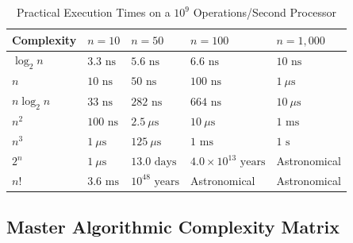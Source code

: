 \documentclass[10pt,a4paper]{article}
\theoremstyle{definition}
\begin{document}
\begin{table}[htbp]
\centering
\small
\caption{Practical Execution Times on a $10^9$ Operations/Second Processor}
\label{tab:times}
\vspace{2pt}
\begin{tabular}{@{}lllll@{}}
\toprule
\textbf{Complexity} & $n = 10$ & $n = 50$ & $n = 100$ & $n = 1,000$ \\
\midrule
$\log_2 n$ & $3.3 \text{ ns}$ & $5.6 \text{ ns}$ & $6.6 \text{ ns}$ & $10 \text{ ns}$ \\
$n$ & $10 \text{ ns}$ & $50 \text{ ns}$ & $100 \text{ ns}$ & $1 \ \mu\text{s}$ \\
$n \log_2 n$ & $33 \text{ ns}$ & $282 \text{ ns}$ & $664 \text{ ns}$ & $10 \ \mu\text{s}$ \\
$n^2$ & $100 \text{ ns}$ & $2.5 \ \mu\text{s}$ & $10 \ \mu\text{s}$ & $1 \text{ ms}$ \\
$n^3$ & $1 \ \mu\text{s}$ & $125 \ \mu\text{s}$ & $1 \text{ ms}$ & $1 \text{ s}$ \\
$2^n$ & $1 \ \mu\text{s}$ & $13.0 \text{ days}$ & $4.0 \times 10^{13} \text{ years}$ & Astronomical \\
$n!$ & $3.6 \text{ ms}$ & $10^{48} \text{ years}$ & Astronomical & Astronomical \\
\bottomrule
\end{tabular}
\end{table}

\subsection{Master Algorithmic Complexity Matrix}
\end{document}

